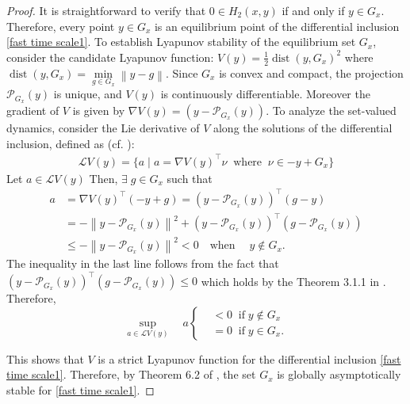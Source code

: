 \documentclass[9pt,journal,twoside,web]{ieeecolor}
\newcommand{\norm}[1]{\left\lVert #1 \right\rVert}
\DeclareMathOperator*{\dist}{dist}
\begin{document}
\begin{proof}
    It is straightforward to verify that $0 \in H_2 (x,y)$ if and only if $y \in G_x$. Therefore, every point $ y \in G_x$ is an equilibrium point of the differential inclusion \eqref{fast time scale1}.
To establish Lyapunov stability of the equilibrium set $G_x$, consider the candidate Lyapunov function: $  V(y) = \frac{1}{2} \dist (y,G_x)^2$
where $\dist (y,G_x) = \min\limits_{g \in G_x} \norm{y-g}$. Since $G_x$ is convex and compact, the projection $\mathcal{P}_{G_x}(y)$ is unique, and $V(y)$ is continuously differentiable. Moreover the gradient of $V$ is given by
$\nabla V(y) = (y- \mathcal{P}_{G_x} (y))$.
 To analyze the set-valued dynamics, consider the Lie derivative of 
$V$ along the solutions of the differential inclusion, defined as (cf. \cite{Cortes}):
 \begin{equation*}
         \begin{split}
             \mathcal{L} V (y) = \{ a \; | \; a = \nabla V(y)^\top \nu \; \; \text{where} \; \; \nu \in - y+ G_x \}
         \end{split}
     \end{equation*}
Let $a \in  \mathcal{L} V (y) $  Then, $\exists \; g \in G_x$ such that 
\begin{equation*}
     \begin{split}
         a & = \nabla V(y)^\top (-y + g)
         =  (y- \mathcal{P}_{G_x} (y))^\top (g-y)
             \\  & =  - \norm{y- \mathcal{P}_{G_x} (y)}^2 + (y- \mathcal{P}_{G_x} (y))^\top (g- \mathcal{P}_{G_x} (y))
             \\ & \leq - \norm{y- \mathcal{P}_{G_x} (y)}^2 < 0 \quad \text{when} \; \quad y \notin G_x .
         \end{split}
     \end{equation*}
The inequality in the last line follows from the fact that
$ (y- \mathcal{P}_{G_x} (y))^\top (g- \mathcal{P}_{G_x} (y)) \leq 0$
which holds by the Theorem 3.1.1 in \cite{hiriart2013convex}.
Therefore,
 \begin{equation*}
         \sup\limits_{a \in \mathcal{L} V(y)} \quad a \begin{cases}
             & < 0 \; \; \text{if} \; y \notin G_x
             \\ & = 0 \; \; \text{if} \; y \in G_x. 
         \end{cases}  
     \end{equation*}

     This shows that 
$V$ is a strict Lyapunov function for the differential inclusion \eqref{fast time scale1}. Therefore, by Theorem 6.2 of \cite{goebel2024set}, the set $G_x$	
  is globally asymptotically stable for \eqref{fast time scale1}. 
\end{proof} 
\end{document}
